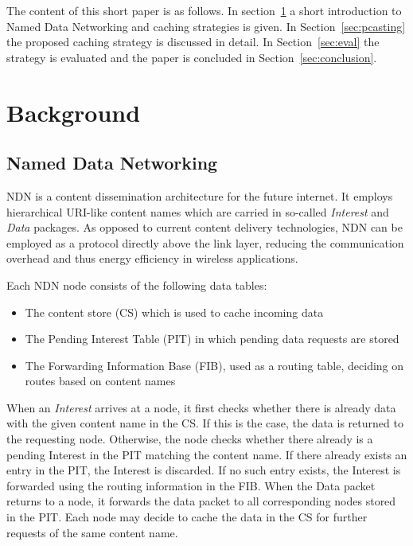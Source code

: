 \documentclass[conference]{IEEEtran}
\begin{document}
The content of this short paper is as follows. In section~\ref{sec:background} a short introduction to Named Data Networking and caching strategies is given. In Section~\ref{sec:pcasting} the proposed caching strategy is discussed in detail. In Section~\ref{sec:eval} the strategy is evaluated and the paper is concluded in Section~\ref{sec:conclusion}.

\section{Background}
\label{sec:background}

\subsection{Named Data Networking}

NDN is a content dissemination architecture for the future internet. It employs hierarchical URI-like content names which are carried in so-called \textit{Interest} and \textit{Data} packages. As opposed to current content delivery technologies, NDN can be employed as a protocol directly above the link layer\cite{Baccelli2014}, reducing the communication overhead and thus energy efficiency in wireless applications.

Each NDN node consists of the following data tables:
\begin{itemize}
    \item The content store (CS) which is used to cache incoming data
    \item The Pending Interest Table (PIT) in which pending data requests are stored
    \item The Forwarding Information Base (FIB), used as a routing table, deciding on routes based on content names
\end{itemize}

When an \textit{Interest} arrives at a node, it first checks whether there is already data with the given content name in the CS. If this is the case, the data is returned to the requesting node. Otherwise, the node checks whether there already is a pending Interest in the PIT matching the content name. If there already exists an entry in the PIT, the Interest is discarded. If no such entry exists, the Interest is forwarded using the routing information in the FIB. When the Data packet returns to a node, it forwards the data packet to all corresponding nodes stored in the PIT. Each node may decide to cache the data in the CS for further requests of the same content name.
\end{document}

